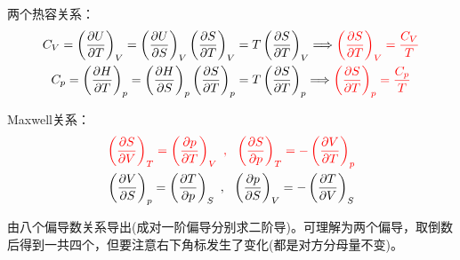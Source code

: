 \documentclass[zihao=-4,UTF8]{report}
\begin{document}
两个热容关系：
\begin{gather}
    C_V = \left(\frac{\partial U }{\partial T }\right)_{V} =  \left(\frac{\partial U }{\partial S }\right)_{V} \left(\frac{\partial S }{\partial T }\right)_{V} = T \left(\frac{\partial S }{\partial T }\right)_{V}
    \Longrightarrow {\color{red}\left(\frac{\partial S}{\partial T}\right)_V = \frac{C_V}{T} }
    \\
    C_p = \left(\frac{\partial H }{\partial T }\right)_{p} =  \left(\frac{\partial H }{\partial S }\right)_{p} \left(\frac{\partial S }{\partial T }\right)_{p} = T \left(\frac{\partial S }{\partial T }\right)_{p}
    \Longrightarrow  {\color{red}\left(\frac{\partial S}{\partial T}\right)_p =\frac{C_p}{T} }
\end{gather}

Maxwell关系：
\begin{gather}
    {\color{red}
    \left(\frac{\partial S}{\partial V}\right)_T =\left(\frac{\partial p}{\partial T}\right)_V\ ,\ \ \left(\frac{\partial S}{\partial p}\right)_T = -\left(\frac{\partial V}{\partial T}\right)_p
    }
    \\
    \left(\frac{\partial V}{\partial S}\right)_p = \left(\frac{\partial T}{\partial p}\right)_S  \ ,\ \  \left(\frac{\partial p}{\partial S}\right)_V = - \left(\frac{\partial T}{\partial V}\right)_S
\end{gather}
{\par\color{gray}\small
由八个偏导数关系导出(成对一阶偏导分别求二阶导)。可理解为两个偏导，取倒数后得到一共四个，但要注意右下角标发生了变化(都是对方分母量不变)。
\par}
\end{document}
